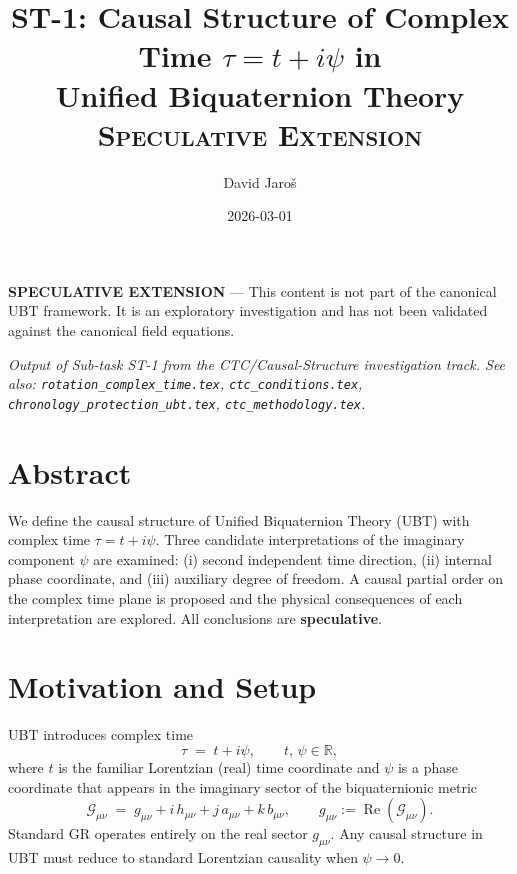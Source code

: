 \documentclass[12pt]{article}
\title{ST-1: Causal Structure of Complex Time $\tau = t + i\psi$ in\\
Unified Biquaternion Theory\\[0.5em]
\large\textsc{Speculative Extension}}
\author{David Jaroš}
\date{2026-03-01}
\begin{document}
\maketitle

\begin{tcolorbox}[colback=yellow!10, title=Status]
\textbf{SPECULATIVE EXTENSION} — This content is not part of
the canonical UBT framework. It is an exploratory investigation
and has not been validated against the canonical field equations.
\end{tcolorbox}

\vspace{1em}
\noindent\textit{Output of Sub-task ST-1 from the CTC/Causal-Structure investigation track.
See also: \texttt{rotation\_complex\_time.tex}, \texttt{ctc\_conditions.tex},
\texttt{chronology\_protection\_ubt.tex}, \texttt{ctc\_methodology.tex}.}

\section*{Abstract}
We define the causal structure of Unified Biquaternion Theory (UBT) with
complex time $\tau = t + i\psi$.  Three candidate interpretations of the
imaginary component $\psi$ are examined: (i) second independent time
direction, (ii) internal phase coordinate, and (iii) auxiliary degree of
freedom.  A causal partial order on the complex time plane is proposed and
the physical consequences of each interpretation are explored.
All conclusions are \textbf{speculative}.

\section{Motivation and Setup}
UBT introduces complex time
\begin{equation}
  \tau \;=\; t + i\psi , \qquad t,\,\psi \in \mathbb{R},
  \label{eq:complex_time}
\end{equation}
where $t$ is the familiar Lorentzian (real) time coordinate and $\psi$ is
a phase coordinate that appears in the imaginary sector of the biquaternionic
metric
\begin{equation}
  \mathcal{G}_{\mu\nu} \;=\; g_{\mu\nu} + i\,h_{\mu\nu}
                                + j\,a_{\mu\nu} + k\,b_{\mu\nu}, \qquad
  g_{\mu\nu} := \operatorname{Re}(\mathcal{G}_{\mu\nu}).
  \label{eq:biquat_metric}
\end{equation}
Standard GR operates entirely on the real sector $g_{\mu\nu}$.  Any causal
structure in UBT must reduce to standard Lorentzian causality when
$\psi \to 0$.
\end{document}
